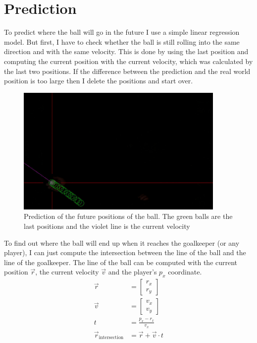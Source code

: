 \section{Prediction}\label{sec:prediction}
To predict where the ball will go in the future I use a simple linear regression\autocite{linear_regression} model.
But first, I have to check whether the ball is still rolling into the same direction and with the same velocity.
This is done by using the last position and computing the current position with the current velocity, which was calculated by the last two positions.
If the difference between the prediction and the real world position is too large then I delete the positions and start over.
\begin{figure}[H]
    \centering
    \includegraphics[width=0.9\textwidth]{../photos/ball_prediction}
    \caption[ball-prediction]{Prediction of the future positions of the ball. The green balls are the last positions and the violet line is the current velocity}
    \label{fig:ball_prediction}
\end{figure}
To find out where the ball will end up when it reaches the goalkeeper (or any player), I can just compute the intersection between the line of the ball and the line of the goalkeeper.
The line of the ball can be computed with the current position $\vec{r}$, the current velocity $\vec{v}$ and the player's $p_x$ coordinate.
\begin{equation}
    \begin{split}
        \vec{r} &= \begin{bmatrix}
                       r_x \\
                       r_y
        \end{bmatrix}\\
        \vec{v} &= \begin{bmatrix}
                       v_x \\
                       v_y
        \end{bmatrix}\\
        t &= \frac{p_x - r_x}{v_x}\\
        \vec{r}_\text{intersection} &= \vec{r} + \vec{v} \cdot t
    \end{split}\label{eq:ball_intersection}
\end{equation}
